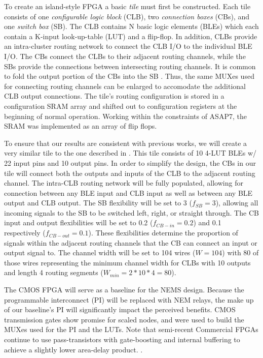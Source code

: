 \documentclass[twoside,twocolumn]{article}
\begin{document}
To create an island-style FPGA a basic \textit{tile} must first be constructed. 
Each tile consists of one \textit{configurable logic block} (CLB), 
two \textit{connection boxes} (CBs), and one \textit{switch box} (SB). 
The CLB contains N basic logic elements (BLEs) which each contain a K-input 
look-up-table (LUT) and a flip-flop. In addition, CLBs provide an intra-cluster 
routing network to connect the CLB I/O to the individual BLE I/O. The CBs connect
the CLBs to their adjacent routing channels, while the SBs provide the connections
between intersecting routing channels. It is common to fold the output portion of 
the CBs into the SB \cite{chen_efficient_2010}. Thus, the same MUXes used for
connecting routing channels can be enlarged to accomodate the additional 
CLB output connections. The tile's routing configuration is stored in a configuration SRAM array
and shifted out to configuration registers at the beginning of normal operation. Working within
the constraints of ASAP7, the SRAM was implemented as an array of flip flops.

To ensure that our results are consistent with previous works, we
will create a very similar tile to the one described in \cite{chen_efficient_2010}. 
This tile consists of 10 4-LUT BLEs w/ 22 input pins and 10 output pins.
In order to simplify the design, the CBs in our tile will connect both
the outputs and inputs of the CLB to the adjacent routing channel.
The intra-CLB routing network will be fully populated, allowing for connection 
between any BLE input and CLB input as well as between any BLE output and CLB output.
The SB flexibility will be set to 3 ($f_{SB} = 3$), allowing all 
incoming signals to the SB to be switched left, right, or straight through. 
The CB input and output flexibilities will be set to 0.2 ($f_{CB-in} = 0.2$) 
and 0.1 respectively ($f_{CB-out} = 0.1$). These flexibilities determine the 
proportion of signals within the adjacent routing channels that the CB can 
connect an input or output signal to. The channel width will be set to 104 wires
($W=104$) with 80 of those wires representing the minimum channel width for 
CLBs with 10 outputs and length 4 routing segments ($W_{min} = 2 * 10 * 4 = 80$).

The CMOS FPGA will serve as a baseline for the NEMS design.
Because the programmable interconnect (PI) will be replaced with NEM relays, the make up
of our baseline's PI will significantly impact the perceived benefits. 
CMOS transmission gates show promise for scaled nodes, and were used to build the MUXes used 
for the PI and the LUTs. Note that semi-recent Commercial FPGAs continue to use pass-transistors with gate-boosting and internal buffering
to achieve a slightly lower area-delay product. \cite{chiasson_should_2013}.
\end{document}
